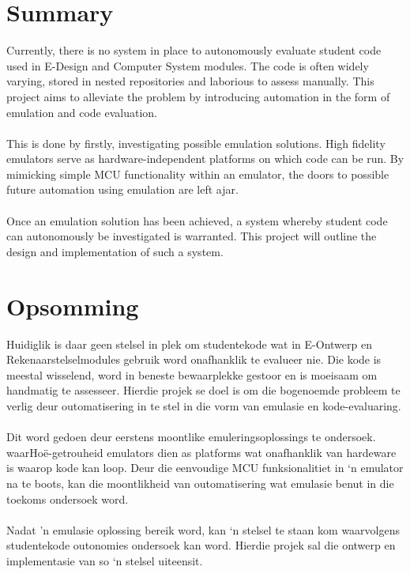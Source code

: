 \section*{Summary}

Currently, there is no system in place to autonomously evaluate student code used in E-Design and Computer System modules. The code is often widely varying, stored in nested repositories and laborious to assess manually. This project aims to alleviate the problem by introducing automation in the form of emulation and code evaluation. 
\\\\
This is done by firstly, investigating possible emulation solutions. High fidelity emulators serve as hardware-independent platforms on which code can be run. By mimicking simple MCU functionality within an emulator, the doors to possible future automation using emulation are left ajar.
\\\\
Once an emulation solution has been achieved, a system whereby student code can autonomously be investigated is warranted. This project will outline the design and implementation of such a system. 

\section*{Opsomming}
Huidiglik is daar geen stelsel in plek om studentekode wat in E-Ontwerp en Rekenaarstelselmodules gebruik word onafhanklik te evalueer nie. Die kode is meestal wisselend, word in beneste bewaarplekke gestoor en is moeisaam om handmatig te assesseer. Hierdie projek se doel is om die bogenoemde probleem te verlig deur outomatisering in te stel in die vorm van emulasie en kode-evaluaring. 
\\\\
Dit word gedoen deur eerstens moontlike emuleringsoplossings te ondersoek. waarHoë-getrouheid emulators dien as platforms wat onafhanklik van hardeware is waarop kode kan loop. Deur die eenvoudige MCU funksionalitiet in ‘n emulator na te boots, kan die moontlikheid van outomatisering wat emulasie benut in die toekoms ondersoek word. 
\\\\
Nadat 'n emulasie oplossing bereik word, kan ‘n stelsel te staan kom waarvolgens studentekode outonomies ondersoek kan word. Hierdie projek sal die ontwerp en implementasie van so ‘n stelsel uiteensit.
